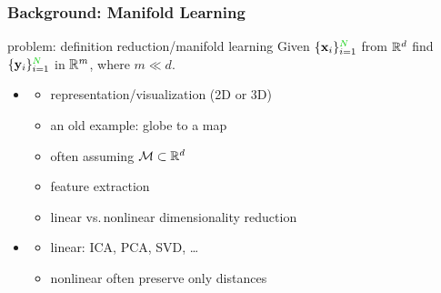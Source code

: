 \documentclass{beamer}
\begin{document}
\newcommand{\topictitle}{Manifold Learning}
\newcommand{\topicsubtitle}{Laplacian Eigenmaps}

\MakeTopicSlide

\begin{frame}
\frametitle{Background: Manifold Learning}

\begin{block}{problem: definition reduction/manifold learning}
Given $\{\bx_i\}_{i=1}^\nodes$ from $\mathbb{R}^d$ find $\{\by_i\}_{i=1}^\nodes$
in $\mathbb{R}^m$, where $m \ll d$.
\end{block} 
\pause
\begin{itemize}[<+-| alert@+>]%
\item {}
\begin{itemize}
\item representation/visualization (2D or 3D)
\item an old example: globe to a map
\item often assuming ${\cal M} \subset \mathbb{R}^d$
\item feature extraction
\item linear vs.\,nonlinear dimensionality reduction
\end{itemize}
\item {}
\begin{itemize}[<+-| alert@+>]%
\item linear: ICA, PCA, SVD, \dots
\item nonlinear often preserve only  distances
\end{itemize}
\end{itemize}

\end{frame}
\end{document}
